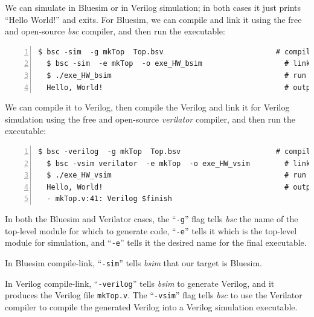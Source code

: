 \vspace{1ex}

We can simulate in Bluesim or in Verilog simulation; in both cases it
just prints ``Hello World!'' and exits.  For Bluesim, we can compile
and link it using the free and open-source \emph{bsc} compiler, and
then run the executable:

{\footnotesize
\begin{Verbatim}[frame=single, numbers=left]
  $ bsc -sim  -g mkTop  Top.bsv                          # compile
  $ bsc -sim  -e mkTop  -o exe_HW_bsim                   # link
  $ ./exe_HW_bsim                                        # run
  Hello, World!                                          # output
\end{Verbatim}
}

We can compile it to Verilog, then compile the Verilog and link it for
Verilog simulation using the free and open-source \emph{verilator}
compiler, and then run the executable:

{\footnotesize
\begin{Verbatim}[frame=single, numbers=left]
  $ bsc -verilog  -g mkTop  Top.bsv                      # compile -> mkTop.v
  $ bsc -vsim verilator  -e mkTop  -o exe_HW_vsim        # link
  $ ./exe_HW_vsim                                        # run
  Hello, World!                                          # output
  - mkTop.v:41: Verilog $finish
\end{Verbatim}
}

In both the Bluesim and Verilator cases, the ``\verb|-g|'' flag tells
\emph{bsc} the name of the top-level module for which to generate
code, ``\verb|-e|'' tells it which is the top-level module for
simulation, and ``\verb|-e|'' tells it the desired name for the final
executable.

In Bluesim compile-link, ``\verb|-sim|'' tells \emph{bsim} that our
target is Bluesim.

In Verilog compile-link, ``\verb|-verilog|'' tells \emph{bsim} to
generate Verilog, and it produces the Verilog file \verb|mkTop.v|.
The ``\verb|-vsim|'' flag tells \emph{bsc} to use the Verilator
compiler to compile the generated Verilog into a Verilog simulation
executable.




